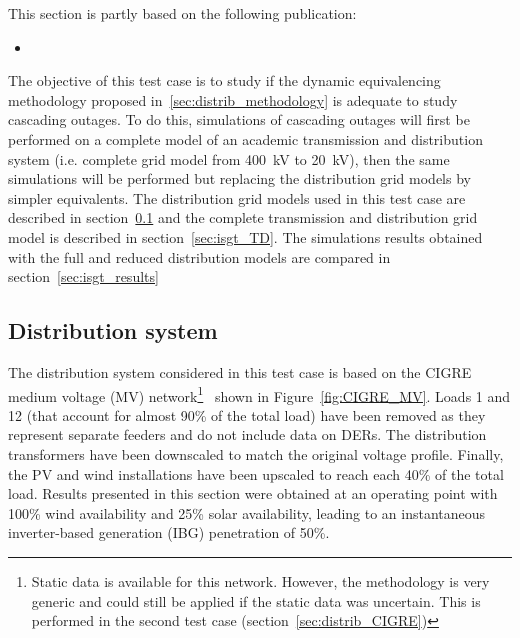 \begin{tcolorbox}[width=\linewidth, sharp corners=all,
    colback=white!80!black,
    colframe=white!80!black]
This section is partly based on the following publication:
\begin{itemize}
    \item {}
\end{itemize}
\end{tcolorbox}


The objective of this test case is to study if the dynamic equivalencing methodology proposed in~\ref{sec:distrib_methodology} is adequate to study cascading outages. To do this, simulations of cascading outages will first be performed on a complete model of an academic transmission and distribution system (i.e. complete grid model from 400~kV to 20~kV), then the same simulations will be performed but replacing the distribution grid models by simpler equivalents. The distribution grid models used in this test case are described in section~\ref{sec:isgt_distrib} and the complete transmission and distribution grid model is described in section~\ref{sec:isgt_TD}. The simulations results obtained with the full and reduced distribution models are compared in section~\ref{sec:isgt_results}

\subsection{Distribution system}
\label{sec:isgt_distrib}

The distribution system considered in this test case is based on the CIGRE medium voltage (MV) network\footnote{Static data is available for this network. However, the methodology is very generic and could still be applied if the static data was uncertain. This is performed in the second test case (section~\ref{sec:distrib_CIGRE})}~\cite{CIGREMV} shown in Figure~\ref{fig:CIGRE_MV}. Loads 1 and 12 (that account for almost 90\% of the total load) have been removed as they represent separate feeders and do not include data on DERs. The distribution transformers have been downscaled to match the original voltage profile. Finally, the PV and wind installations have been upscaled to reach each 40\% of the total load. Results presented in this section were obtained at an operating point with 100\% wind availability and 25\% solar availability, leading to an instantaneous inverter-based generation (IBG) penetration of 50\%.


